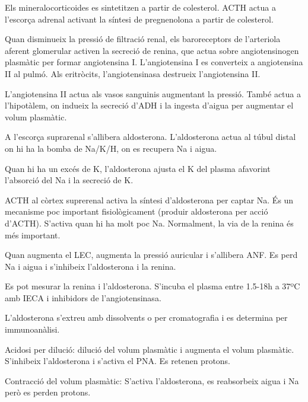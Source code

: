 Els mineralocorticoides es sintetitzen a partir de colesterol. ACTH
actua a l'escorça adrenal activant la síntesi de pregnenolona a partir
de colesterol.

Quan disminueix la pressió de filtració renal, els baroreceptors de
l'arteriola aferent glomerular activen la secreció de renina, que
actua sobre angiotensinogen plasmàtic per formar angiotensina
I. L'angiotensina I es converteix a angiotensina II al pulmó. Als
eritròcits, l'angiotensinasa destrueix l'angiotensina II.

L'angiotensina II actua als vasos sanguinis augmentant la
pressió. També actua a l'hipotàlem, on indueix la secreció d'ADH i la
ingesta d'aigua per augmentar el volum plasmàtic.

A l'escorça suprarenal s'allibera aldosterona. L'aldosterona actua al
túbul distal on hi ha la bomba de Na/K/H, on es recupera Na i aigua.

Quan hi ha un excés de K, l'aldosterona ajusta el K del plasma
afavorint l'absorció del Na i la secreció de K.

ACTH al còrtex suprerenal activa la síntesi d'aldosterona per captar
Na. És un mecanisme poc important fisiològicament (produir aldosterona
per acció d'ACTH). S'activa quan hi ha molt poc Na. Normalment, la via
de la renina és més important.

Quan augmenta el LEC, augmenta la pressió auricular i s'allibera
ANF. Es perd Na i aigua i s'inhibeix l'aldosterona i la renina.

Es pot mesurar la renina i l'aldosterona. S'incuba el plasma entre
1.5-18h a 37ºC amb IECA i inhibidors de l'angiotensinasa.

L'aldosterona s'extreu amb dissolvents o per cromatografia i es
determina per immunoanàlisi.

Acidosi per dilució: dilució del volum plasmàtic i augmenta el volum
plasmàtic. S'inhibeix l'aldosterona i s'activa el PNA. Es retenen
protons.

Contracció del volum plasmàtic: S'activa l'aldosterona, es reabsorbeix
aigua i Na però es perden protons.

